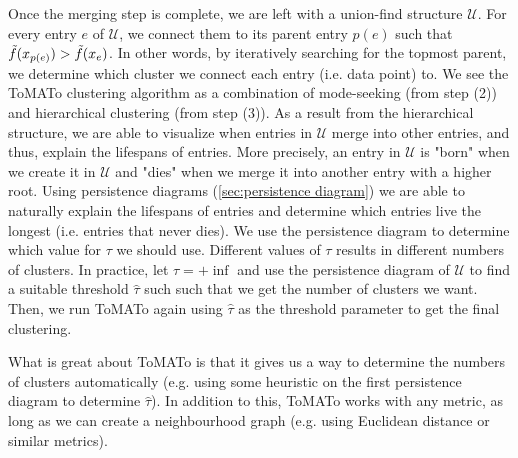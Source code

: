 Once the merging step is complete, we are left with a union-find structure $\mathcal{U}$. For every entry $e$ of $\mathcal{U}$, we connect them to its parent entry $p(e)$ such that $\Tilde{f}(x_{p(e)}) > \Tilde{f}(x_e)$. In other words, by iteratively searching for the topmost parent, we determine which cluster we connect each entry (i.e. data point) to. We see the ToMATo clustering algorithm as a combination of mode-seeking (from step (2)) and hierarchical clustering (from step (3)). As a result from the hierarchical structure, we are able to visualize when entries in $\mathcal{U}$ merge into other entries, and thus, explain the lifespans of entries. More precisely, an entry in $\mathcal{U}$ is "born" when we create it in $\mathcal{U}$ and "dies" when we merge it into another entry with a higher root. Using persistence diagrams (\cref{sec:persistence diagram}) we are able to naturally explain the lifespans of entries and determine which entries live the longest (i.e. entries that never dies). We use the persistence diagram to determine which value for $\tau$ we should use. Different values of $\tau$ results in different numbers of clusters. In practice, let $\tau = +\inf$ and use the persistence diagram of $\mathcal{U}$ to find a suitable threshold $\hat{\tau}$ such such that we get the number of clusters we want. Then, we run ToMATo again using $\hat{\tau}$ as the threshold parameter to get the final clustering.

What is great about ToMATo is that it gives us a way to determine the numbers of clusters automatically (e.g. using some heuristic on the first persistence diagram to determine $\hat{\tau}$). In addition to this, ToMATo works with any metric, as long as we can create a neighbourhood graph (e.g. using Euclidean distance or similar metrics).

